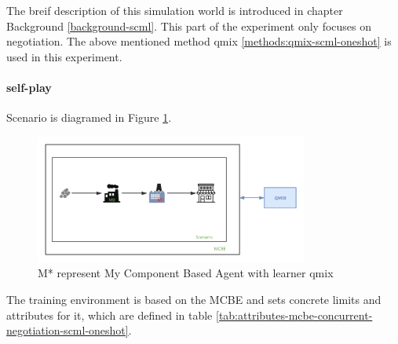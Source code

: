 The breif description of this simulation world is introduced in chapter Background \ref{background-scml}. This part of the experiment only focuses on negotiation. The above mentioned method qmix \ref{methods:qmix-scml-oneshot} is used in this experiment. 

\paragraph{self-play}

Scenario is diagramed in Figure \ref{fig:scenario-oneshot-scml-self-play}.
\begin{figure}[htbp]
\centering
\includegraphics[width=0.80\textwidth]{./images/scenario-oneshot-scml-self-play.png}
\caption{M* represent My Component Based Agent with learner \gls{qmix}}
\label{fig:scenario-oneshot-scml-self-play}
\end{figure}

The training environment is based on the MCBE and sets concrete limits and attributes for it,
which are defined in table \ref{tab:attributes-mcbe-concurrent-negotiation-scml-oneshot}.

